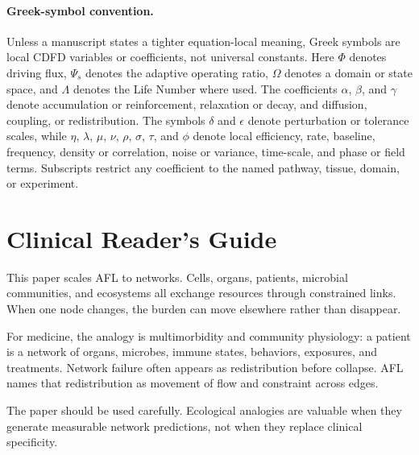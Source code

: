 \documentclass[11pt]{article}
\begin{document}
\paragraph{Greek-symbol convention.}
Unless a manuscript states a tighter equation-local meaning, Greek symbols are local CDFD variables or coefficients, not universal constants. Here $\Phi$ denotes driving flux, $\Psi_s$ denotes the adaptive operating ratio, $\Omega$ denotes a domain or state space, and $\Lambda$ denotes the Life Number where used. The coefficients $\alpha$, $\beta$, and $\gamma$ denote accumulation or reinforcement, relaxation or decay, and diffusion, coupling, or redistribution. The symbols $\delta$ and $\epsilon$ denote perturbation or tolerance scales, while $\eta$, $\lambda$, $\mu$, $\nu$, $\rho$, $\sigma$, $\tau$, and $\phi$ denote local efficiency, rate, baseline, frequency, density or correlation, noise or variance, time-scale, and phase or field terms. Subscripts restrict any coefficient to the named pathway, tissue, domain, or experiment.

\section*{Clinical Reader's Guide}
This paper scales AFL to networks. Cells, organs, patients, microbial communities, and ecosystems all exchange resources through constrained links. When one node changes, the burden can move elsewhere rather than disappear.

For medicine, the analogy is multimorbidity and community physiology: a patient is a network of organs, microbes, immune states, behaviors, exposures, and treatments. Network failure often appears as redistribution before collapse. AFL names that redistribution as movement of flow and constraint across edges.

The paper should be used carefully. Ecological analogies are valuable when they generate measurable network predictions, not when they replace clinical specificity.


\vspace{0.5em}\noindent{}
\vspace{0.75em}
\end{document}
